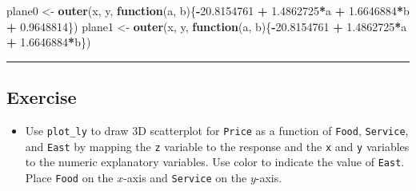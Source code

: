 \documentclass[]{book}
\newenvironment{Shaded}{\begin{snugshade}}{\end{snugshade}}
\newcommand{\KeywordTok}[1]{\textcolor[rgb]{0.13,0.29,0.53}{\textbf{#1}}}
\newcommand{\DataTypeTok}[1]{\textcolor[rgb]{0.13,0.29,0.53}{#1}}
\newcommand{\FloatTok}[1]{\textcolor[rgb]{0.00,0.00,0.81}{#1}}
\newcommand{\StringTok}[1]{\textcolor[rgb]{0.31,0.60,0.02}{#1}}
\newcommand{\CommentTok}[1]{\textcolor[rgb]{0.56,0.35,0.01}{\textit{#1}}}
\newcommand{\ControlFlowTok}[1]{\textcolor[rgb]{0.13,0.29,0.53}{\textbf{#1}}}
\newcommand{\OperatorTok}[1]{\textcolor[rgb]{0.81,0.36,0.00}{\textbf{#1}}}
\newcommand{\NormalTok}[1]{#1}
\providecommand{\tightlist}{%
  \setlength{\itemsep}{0pt}\setlength{\parskip}{0pt}}
\begin{document}
\begin{Shaded}
\begin{Highlighting}[]
\NormalTok{plane0 <-}\StringTok{ }\KeywordTok{outer}\NormalTok{(x, y, }\ControlFlowTok{function}\NormalTok{(a, b)\{}\OperatorTok{-}\FloatTok{20.8154761} \OperatorTok{+}\StringTok{ }\FloatTok{1.4862725}\OperatorTok{*}\NormalTok{a }\OperatorTok{+}\StringTok{ }\FloatTok{1.6646884}\OperatorTok{*}\NormalTok{b }\OperatorTok{+}\StringTok{ }\FloatTok{0.9648814}\NormalTok{\})}
\NormalTok{plane1 <-}\StringTok{ }\KeywordTok{outer}\NormalTok{(x, y, }\ControlFlowTok{function}\NormalTok{(a, b)\{}\OperatorTok{-}\FloatTok{20.8154761} \OperatorTok{+}\StringTok{ }\FloatTok{1.4862725}\OperatorTok{*}\NormalTok{a }\OperatorTok{+}\StringTok{ }\FloatTok{1.6646884}\OperatorTok{*}\NormalTok{b\})}
\end{Highlighting}
\end{Shaded}

\begin{center}\rule{0.5\linewidth}{\linethickness}\end{center}

\subsection*{Exercise}\label{exercise-24}

\begin{itemize}
\tightlist
\item
  Use \texttt{plot\_ly} to draw 3D scatterplot for \texttt{Price} as a
  function of \texttt{Food}, \texttt{Service}, and \texttt{East} by
  mapping the \texttt{z} variable to the response and the \texttt{x} and
  \texttt{y} variables to the numeric explanatory variables. Use color
  to indicate the value of \texttt{East}. Place \texttt{Food} on the
  \(x\)-axis and \texttt{Service} on the \(y\)-axis.
\end{itemize}

\begin{Shaded}
\end{Shaded}
\end{document}
